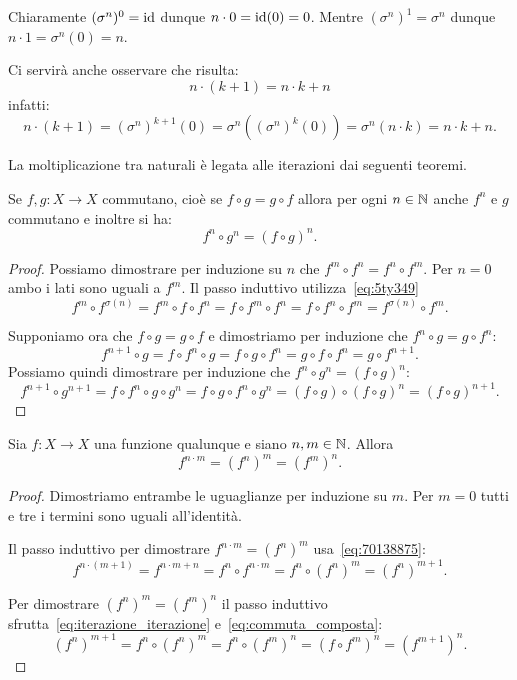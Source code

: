 Chiaramente $(\sigma^n)^0=\mathrm{id}$ dunque $n\cdot 0=\mathrm{id}(0) = 0$.
Mentre $(\sigma^n)^1=\sigma^n$ dunque $n\cdot 1 = \sigma^n(0) = n$.  

Ci servirà anche osservare che risulta:
\begin{equation}\label{eq:70138875}
  n\cdot (k+1) = n\cdot k + n
\end{equation}
infatti:
\[
 n\cdot(k+1) 
 = (\sigma^n)^{k+1}(0)  
 = \sigma^n ((\sigma^n)^k(0))
 = \sigma^n (n\cdot k) = n\cdot k + n.
\]

La moltiplicazione tra naturali è legata 
alle iterazioni dai seguenti teoremi.
\begin{theorem}
  \label{th:commuta_composta}%
  Se $f,g\colon X\to X$ commutano, cioè se $f\circ g = g\circ f$ 
  allora per ogni $n\in {\mathbb N}$ anche $f^n$ e $g$ commutano
  e inoltre si ha:
  \begin{equation}\label{eq:commuta_composta}
    f^n\circ g^n = (f\circ g)^n.
  \end{equation}
\end{theorem}
\begin{proof}
Possiamo dimostrare per induzione su $n$ che 
$f^m\circ f^n = f^n \circ f^m$.
Per $n=0$ ambo i lati sono uguali a $f^m$. 
Il passo induttivo utilizza~\eqref{eq:5ty349}
\[
f^m \circ f^{\sigma(n)} 
= f^m \circ f \circ f^n 
= f\circ f^m \circ f^n  
= f \circ f^n \circ f^m
= f^{\sigma(n)} \circ f^m. 
\]

Supponiamo ora che $f\circ g = g\circ f$ e dimostriamo per 
induzione che $f^n\circ g = g\circ f^n$:
\[
f^{n+1}\circ g 
= f \circ f^n \circ g 
= f \circ g \circ f^n 
= g \circ f \circ f^n
= g \circ f^{n+1}.
\]
Possiamo quindi dimostrare per induzione che $f^n\circ g^n = (f\circ g)^n$:
\[
f^{n+1}\circ g^{n+1}
=f\circ f^n \circ g \circ g^n
=f\circ g\circ f^n\circ g^n 
= (f\circ g) \circ (f\circ g)^n
= (f\circ g)^{n+1}. 
\]
\end{proof}

\begin{theorem}
Sia $f\colon X\to X$ una funzione qualunque e siano $n,m\in{\mathbb N}$.
Allora 
\begin{equation}\label{eq:iterazione_iterazione}
  f^{n\cdot m} = (f^n)^m = (f^m)^n.    
\end{equation}
\end{theorem}
%
\begin{proof}
Dimostriamo entrambe le uguaglianze per induzione su $m$.
Per $m=0$ tutti e tre i termini sono uguali all'identità.

Il passo induttivo per dimostrare $f^{n\cdot m}=(f^n)^m$ 
usa~\eqref{eq:70138875}:
\[
f^{n\cdot (m+1)}
=f^{n\cdot m + n } 
= f^n \circ f^{n\cdot m}
= f^n \circ (f^n)^m
= (f^n)^{m+1}.
\]

Per dimostrare $(f^n)^m = (f^m)^n$ 
il passo induttivo sfrutta~\eqref{eq:iterazione_iterazione}
e~\eqref{eq:commuta_composta}:
\[
(f^n)^{m+1}
= f^n \circ (f^n)^m
= f^n \circ (f^m)^n
= (f\circ f^m)^n
= (f^{m+1})^n.
\]
\end{proof}

